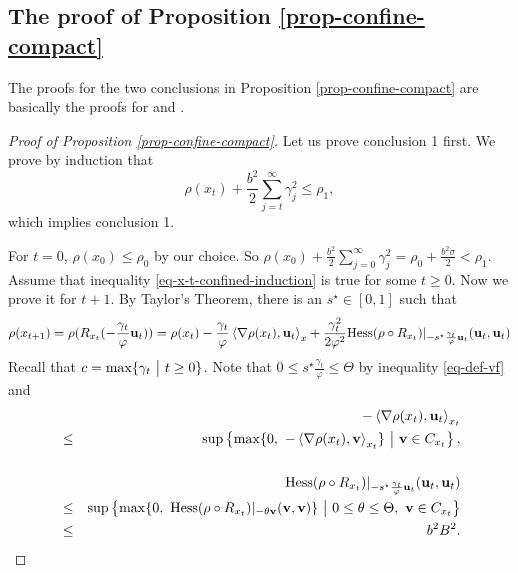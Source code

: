 \documentclass{amsart}
\newcommand{\vf}{\varphi}
\newcommand{\Hess}{\mathrm{Hess}}
\newcommand{\g}{\gamma}
\theoremstyle{plain}
\theoremstyle{definition}
\theoremstyle{remark}
\numberwithin{theorem}{section}
\numberwithin{equation}{section}
\begin{document}
\subsection{The proof of Proposition \ref{prop-confine-compact}} The proofs for the two conclusions in Proposition \ref{prop-confine-compact} are basically the proofs for \cite[Lemma A.2]{XYW-2024} and \cite[Lemma 2.9]{YXW-2024}.

\begin{proof}[Proof of Proposition \ref{prop-confine-compact}]
Let us prove conclusion 1 first. We prove by induction that 
\begin{equation}\label{eq-x-t-confined-induction}
\rho(x_t) + \frac{b^2}{2}\sum_{j=t}^\infty \g_j^2 \leq \rho_1,
\end{equation} 
which implies conclusion 1.

For $t=0$, $\rho(x_0)\leq \rho_0$ by our choice. So $\rho(x_0) + \frac{b^2}{2}\sum_{j=0}^\infty \g_j^2 = \rho_0 +\frac{b^2 \sigma}{2} < \rho_1$. Assume that inequality \eqref{eq-x-t-confined-induction} is true for some $t\geq 0$. Now we prove it for $t+1$. By Taylor's Theorem, there is an $s^\star \in [0,1]$ such that
\[
\rho(x_{t+1}) = \rho (R_{x_t}(-\frac{\g_t}{\vf}\mathbf{u}_t)) =\rho (x_t) - \frac{\g_t}{\vf}\left\langle  \nabla \rho(x_t), \mathbf{u}_t\right\rangle_x  + \frac{\g_t^2}{2\vf^2}\Hess(\rho\circ R_{x_t})|_{-s^\star \frac{\g_t}{\vf}\mathbf{u}_t} (\mathbf{u}_t,\mathbf{u}_t) \\
\]
Recall that $c= \max \{\g_t~\big{|}~t\geq 0\}$. Note that $0\leq s^\star \frac{\g_t}{\vf}\leq \Theta$ by inequality \eqref{eq-def-vf} and
\begin{eqnarray}
\label{eq-u-t-A}&&  - \left\langle \nabla \rho(x_t), \mathbf{u}_t\right\rangle_{x_t} \\
\nonumber& \leq &  \sup\left\{\max\{0, ~-\left\langle  \nabla\rho(x_t), \mathbf{v}\right\rangle_{x_t}\}~\big{|}~\mathbf{v} \in C_{x_t}\right\}, \\
\nonumber&& \\
\label{eq-u-t-B} && \Hess(\rho\circ R_{x_t})|_{-s^\star \frac{\g_t}{\vf}\mathbf{u}_t} (\mathbf{u}_t,\mathbf{u}_t) \\
\nonumber& \leq & \sup\left\{\max\{0, ~\Hess(\rho\circ R_{x_t})|_{-\theta\mathbf{v}}(\mathbf{v},\mathbf{v})\}~\big{|}~0\leq \theta \leq \Theta,~\mathbf{v}\in C_{x_t}\right\} \\
\nonumber &  \leq & b^2B^2.
\end{eqnarray}


\end{proof}
\end{document}

